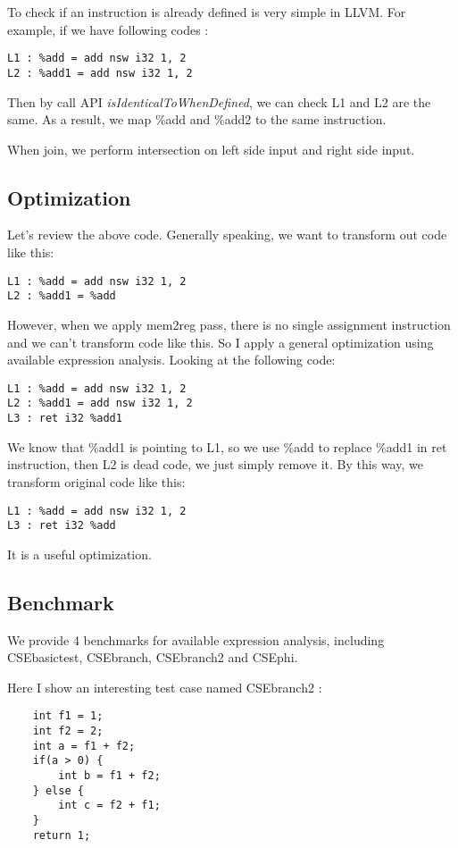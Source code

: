 To check if an instruction is already defined is very simple in LLVM. For example, if we have following codes :
\begin{verbatim}
L1 : %add = add nsw i32 1, 2
L2 : %add1 = add nsw i32 1, 2
\end{verbatim}
Then by call API \emph{isIdenticalToWhenDefined}, we can check L1 and L2 are the same. As a result, we map \%add and \%add2 to the same instruction.

When join, we perform intersection on left side input and right side input.

\subsection{Optimization}
Let's review the above code. Generally speaking, we want to transform out code like this:
\begin{verbatim}
L1 : %add = add nsw i32 1, 2
L2 : %add1 = %add
\end{verbatim}
However, when we apply mem2reg pass, there is no single assignment instruction and we can't transform code like this. So I apply a general optimization using available expression analysis. Looking at the following code:

\begin{verbatim}
L1 : %add = add nsw i32 1, 2
L2 : %add1 = add nsw i32 1, 2
L3 : ret i32 %add1
\end{verbatim}

We know that \%add1 is pointing to L1, so we use \%add to replace \%add1 in ret instruction, then L2 is dead code, we just simply remove it. By this way, we transform original code like this:
\begin{verbatim}
L1 : %add = add nsw i32 1, 2
L3 : ret i32 %add
\end{verbatim}

It is a useful optimization.

\subsection{Benchmark}
We provide 4 benchmarks for available expression analysis, including CSEbasictest, CSEbranch, CSEbranch2	 and CSEphi.

Here I show an interesting test case named CSEbranch2 :
	
\begin{verbatim}
	int f1 = 1;
	int f2 = 2;
	int a = f1 + f2;
	if(a > 0) {
	    int b = f1 + f2;
	} else {
	    int c = f2 + f1;
	}
	return 1;
\end{verbatim}

